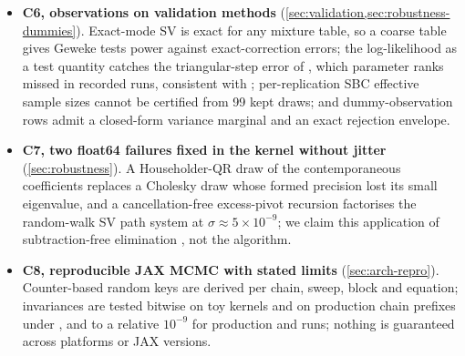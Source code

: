 \begin{itemize}
\item \textbf{C6, observations on validation methods} (\cref{sec:validation,sec:robustness-dummies}).
  Exact-mode SV is exact for any mixture table, so a coarse table gives Geweke tests power against exact-correction errors; %
  the log-likelihood as a test quantity catches the triangular-step error of \citet{carriero2019large}, which parameter ranks missed in recorded runs, consistent with \citet{modrak2025simulation}; %
  per-replication SBC effective sample sizes cannot be certified from 99 kept draws; %
  and dummy-observation rows admit a closed-form variance marginal and an exact rejection envelope. %
\item \textbf{C7, two float64 failures fixed in the kernel without jitter} (\cref{sec:robustness}).
  A Householder-QR draw of the contemporaneous coefficients replaces a Cholesky draw whose formed precision lost its small eigenvalue, and a cancellation-free excess-pivot recursion factorises the random-walk SV path system at $\sigma\approx5\times10^{-9}$; %
  we claim this application of subtraction-free elimination \citep{grassmann1985regenerative,alfa2002accurate,ye2008computing,demmel2008accurate}, not the algorithm. %
\item \textbf{C8, reproducible JAX MCMC with stated limits} (\cref{sec:arch-repro}).
  Counter-based random keys \citep{salmon2011parallel} are derived per chain, sweep, block and equation; %
  invariances are tested bitwise on toy kernels and on production chain prefixes under , and to a relative $10^{-9}$ for production  and  runs; nothing is guaranteed across platforms or JAX versions. %

\end{itemize}
